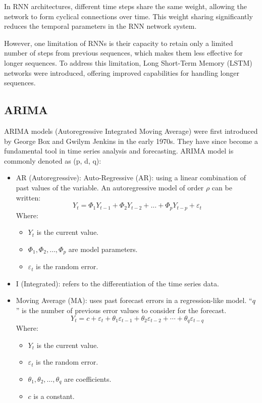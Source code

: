 \documentclass{ieeeojies}
\begin{document}
In RNN architectures, different time steps share the same weight, allowing the network to form cyclical connections over time. This weight sharing significantly reduces the temporal parameters in the RNN network system.

However, one limitation of RNNs is their capacity to retain only a limited number of steps from previous sequences, which makes them less effective for longer sequences. To address this limitation, Long Short-Term Memory (LSTM) networks were introduced, offering improved capabilities for handling longer sequences.
\subsection{ARIMA}
ARIMA models (Autoregressive Integrated Moving Average) were first introduced by George Box and Gwilym Jenkins in the early 1970s. They have since become a fundamental tool in time series analysis and forecasting. ARIMA model is commonly denoted as (p, d, q):
\begin{itemize}
  \item AR (Autoregressive): Auto-Regressive (AR): using a linear combination of past values of the variable. An autoregressive model of order \(\rho\) can be written:
  \[Y_t = \Phi_1 Y_{t-1} + \Phi_2 Y_{t-2} + ... + \Phi_p Y_{t-p} + \varepsilon_t\]
Where:
\begin{itemize}
  \item \( Y_t \) is the current value.
  \item \( \Phi_1, \Phi_2, \ldots, \Phi_p \) are model parameters.
  \item \( \varepsilon_t \) is the random error.
\end{itemize}
  \item I (Integrated): refers to the differentiation of the time series data.
  \item Moving Average (MA): uses past forecast errors in a regression-like model. “\(q\)” is the number of previous error values to consider for the forecast.
\[
Y_t = c + \varepsilon_t + \theta_1 \varepsilon_{t-1} + \theta_2 \varepsilon_{t-2} + \cdots + \theta_q \varepsilon_{t-q}
\]
Where:
\begin{itemize}
  \item \( Y_t \) is the current value.
  \item \( \varepsilon_t \) is the random error.
  \item \( \theta_1, \theta_2, \ldots, \theta_q \) are coefficients.
  \item \( c \) is a constant.
\end{itemize}
\end{itemize}
\end{document}

